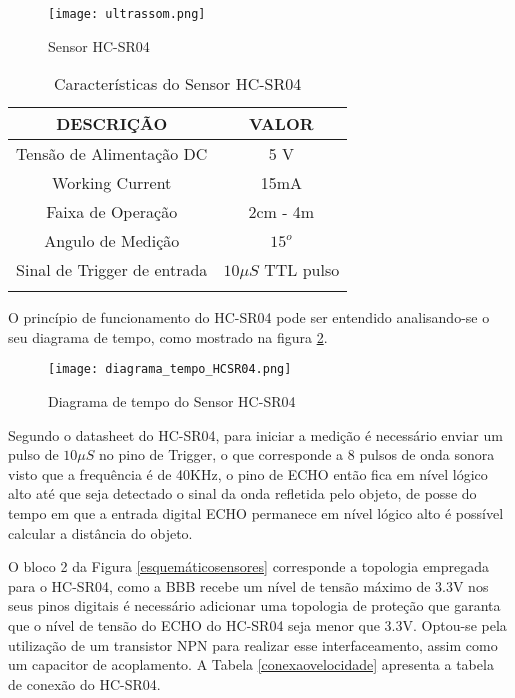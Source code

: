 	\begin{figure}[!h]
		\centering
		\texttt{[image: ultrassom.png]}
		\caption{Sensor HC-SR04}
		\label{ultrassom}
	\end{figure}

	\begin{table}[!h]
	\centering
	\caption{Características do Sensor HC-SR04}
	\vspace{0.5cm}
	\begin{tabular}{ c c}
	\hline
	\textbf{DESCRIÇÃO}	&	\textbf{VALOR}\\
	\hline
	Tensão de Alimentação DC & 5 V\\
	\hline
	Working Current & 15mA\\
	\hline
	Faixa de Operação & 2cm -  4m\\
	\hline
	Angulo de Medição &  $15^o$\\
	\hline
	Sinal de Trigger de entrada & $10\mu S$ TTL pulso\\
	\hline
	\label{descricaoHCSR04}
	\end{tabular}
	\end{table}

	\newpage
	O princípio de funcionamento do HC-SR04 pode ser entendido analisando-se o seu diagrama de tempo, como mostrado na figura \ref{diagramatempo}.

	\begin{figure}[!h]
		\centering
		\texttt{[image: diagrama\_tempo\_HCSR04.png]}
		\caption{Diagrama de tempo do Sensor HC-SR04}
		\label{diagramatempo}
	\end{figure}

	Segundo o datasheet do HC-SR04, para iniciar a medição é necessário enviar um pulso de $10\mu S$ no pino de Trigger, o que corresponde a 8 pulsos de onda sonora visto que a frequência é de 40KHz, o pino de ECHO então fica em nível lógico alto até que seja detectado o sinal da onda refletida pelo objeto, de posse do tempo em que a entrada digital ECHO permanece em nível lógico alto é possível calcular a distância do objeto.

	O bloco 2 da Figura \ref{esquemáticosensores} corresponde a topologia empregada para o HC-SR04, como a BBB recebe um nível de tensão máximo de 3.3V nos seus pinos digitais é necessário adicionar uma topologia de proteção que garanta que o nível de tensão do ECHO do HC-SR04 seja menor que 3.3V. Optou-se pela utilização de um transistor NPN para realizar esse interfaceamento, assim como um capacitor de acoplamento. A Tabela \ref{conexaovelocidade} apresenta a tabela de conexão do HC-SR04.

